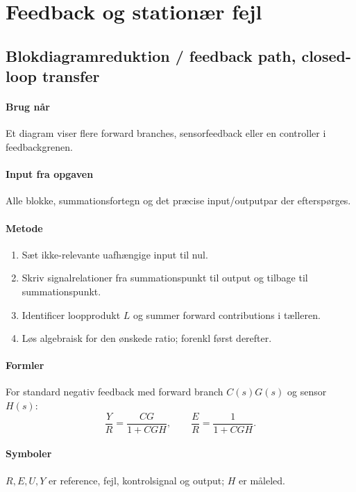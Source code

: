 \section{Feedback og stationær fejl}
\label{sec:feedback}

\subsection{Blokdiagramreduktion / feedback path, closed-loop transfer}

\paragraph{Brug når}
Et diagram viser flere forward branches, sensorfeedback eller en controller i
feedbackgrenen.

\paragraph{Input fra opgaven}
Alle blokke, summationsfortegn og det præcise input/outputpar der efterspørges.

\paragraph{Metode}
\begin{enumerate}
\item Sæt ikke-relevante uafhængige input til nul.
\item Skriv signalrelationer fra summationspunkt til output og tilbage til summationspunkt.
\item Identificer loopprodukt \(L\) og summer forward contributions i tælleren.
\item Løs algebraisk for den ønskede ratio; forenkl først derefter.
\end{enumerate}

\paragraph{Formler}
For standard negativ feedback med forward branch \(C(s)G(s)\) og sensor \(H(s)\):
\[
\frac{Y}{R}=\frac{CG}{1+CGH},\qquad
\frac{E}{R}=\frac{1}{1+CGH}.
\]

\paragraph{Symboler}
\(R,E,U,Y\) er reference, fejl, kontrolsignal og output; \(H\) er måleled.

